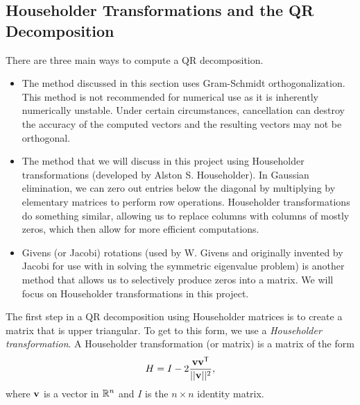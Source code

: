 \subsection*{Householder Transformations and the QR Decomposition}

There are three main ways to compute a QR decomposition.
\begin{itemize}
\item The method discussed in this section uses Gram-Schmidt orthogonalization. This method is not recommended for numerical use as it is inherently numerically unstable. Under certain circumstances, cancellation can destroy the accuracy of the computed vectors and the resulting vectors may not be orthogonal. 
\item The method that we will discuss in this project using Householder transformations (developed by Alston S. Householder). In Gaussian elimination, we can zero out entries below the diagonal by multiplying by elementary matrices to perform row operations. Householder transformations do something similar, allowing us to replace columns with columns of mostly zeros, which then allow for more efficient computations. 
\item Givens (or Jacobi) rotations (used by W. Givens and originally invented by Jacobi for use with in solving the symmetric eigenvalue problem) is another method that allows us to selectively produce zeros into a matrix. We will focus on Householder transformations in this project. 
\end{itemize}

The first step in a QR decomposition using Householder matrices is to create a matrix that is upper triangular. To get to this form, we use a \emph{Householder transformation}. A Householder transformation (or matrix) is a matrix of the form
\[H = I - 2 \frac{\mathbf{v} \mathbf{v}^{\mathsf{T}}}{||\mathbf{v}||^2},\]
where $\mathbf{v}$ is a vector in $\mathbb{R}^n$ and $I$ is the $n \times n$ identity matrix. 

